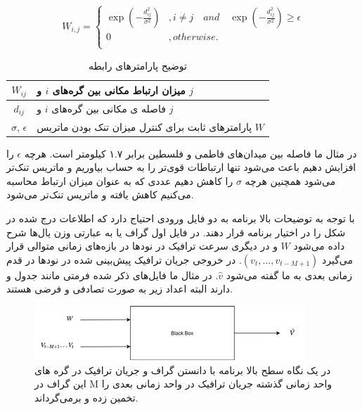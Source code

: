 \documentclass{article}
\begin{document}
\begin{equation}
  W_{i,j} = \left\{
    \begin{array}{ll}
      \exp(-\frac{d^{2}_{ij}}{\sigma^{2}}) & , i \neq j \quad and \quad \exp(-\frac{d^{2}_{ij}}{\sigma^{2}}) \geq \epsilon \\
      0 & , otherwise. \\
    \end{array}\right.
  \label{eq:distance}
\end{equation}

\begin{table}[h]
  \centering
  \caption{توضیح پارامترهای رابطه }
  \begin{tabular}{|c|p{}|}
    \hline
    $W_{ij}$ & میزان ارتباط مکانی بین گره‌های $i$ و $j$ \\
    \hline
    $d_{ij}$ & فاصله ی مکانی بین گره‌های $i$ و $j$ \\
    \hline
    $\sigma$, $\epsilon$ & پارامترهای ثابت برای کنترل میزان تنک{Sparsity} بودن ماتریس $W$ \\
    \hline
  \end{tabular}
  \label{tbl:distance}
\end{table}

در مثال ما فاصله بین میدان‌های فاطمی و فلسطین برابر ۱.۷ کیلومتر است.
هرچه $\epsilon$ را افزایش دهیم باعث می‌شود تنها ارتباطات قوی‌تر را به حساب بیاوریم و ماتریس تنک‌تر می‌شود
همچنین هرچه $\sigma$ را کاهش دهیم عددی که به عنوان میزان ارتباط محاسبه می‌کنیم کاهش یافته و ماتریس تنک‌تر می‌شود.

با توجه به توضیحات بالا برنامه به دو فایل ورودی احتیاج دارد که اطلاعات درج شده در شکل  را در اختیار برنامه قرار دهند.
در فایل اول گراف یا به عبارتی وزن یال‌ها شرح داده می‌شود $W$ و در دیگری سرعت ترافیک در نودها در بازه‌های زمانی متوالی قرار می‌گیرد $(v_{t}, \ldots, v_{t-M+1})$.
در خروجی جریان ترافیک پیش‌بینی شده در نودها در قدم زمانی بعدی به ما گفته می‌شود $\hat{v}$. در مثال ما فایل‌های ذکر شده فرمتی مانند جدول  و  دارند البته اعداد زیر به صورت تصادفی و فرضی هستند.

\begin{figure}
  \includegraphics{./images/blackbox.png}
  \centering
  \caption{
در یک نگاه سطح بالا برنامه با دانستن گراف و جریان ترافیک در گره های این گراف در M واحد زمانی گذشته جریان ترافیک در واحد زمانی بعدی را تخمین زده و برمی‌گرداند.
  }
  \label{fig:blackbox}
\end{figure}
\end{document}
